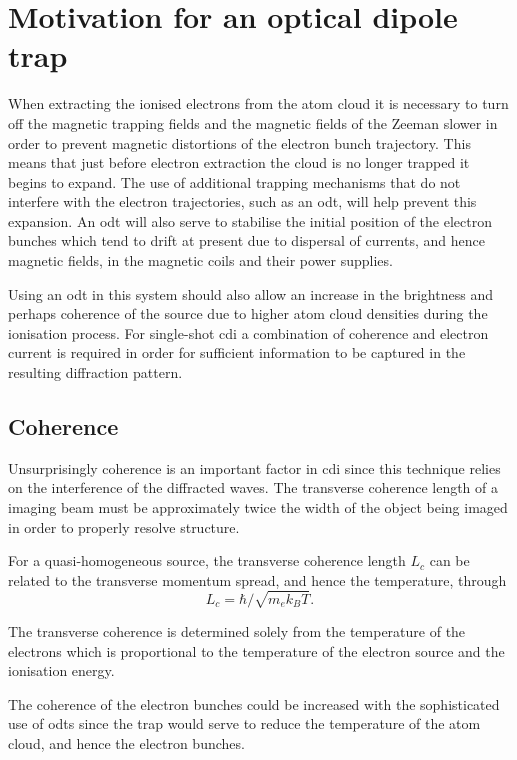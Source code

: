 \section{Motivation for an optical dipole trap}

When extracting the ionised electrons from the atom cloud it is necessary to turn off the magnetic trapping fields and the magnetic fields of the Zeeman slower in order to prevent magnetic distortions of the electron bunch trajectory. This means that just before electron extraction the cloud is no longer trapped it begins to expand. The use of additional trapping mechanisms that do not interfere with the electron trajectories, such as an \gls{odt}, will help prevent this expansion. An \gls{odt} will also serve to stabilise the initial position of the electron bunches which tend to drift at present due to dispersal of currents, and hence magnetic fields, in the magnetic coils and their power supplies.

Using an \gls{odt} in this system should also allow an increase in the brightness and perhaps coherence of the source due to higher atom cloud densities during the ionisation process. For single-shot \gls{cdi} a combination of coherence and electron current is required in order for sufficient information to be captured in the resulting diffraction pattern.

\subsection{Coherence}
Unsurprisingly coherence is an important factor in \gls{cdi} since this technique relies on the interference of the diffracted waves. The transverse coherence length of a imaging beam must be approximately twice the width of the object being imaged\cite{spence_coherence_2004} in order to properly resolve structure.

For a quasi-homogeneous source\cite{nugent_coherent_2009}, the transverse coherence length $L_c$ can be related to the transverse momentum spread, and hence the temperature, through\cite{van_oudheusden_electron_2007}
\begin{equation}
L_c = \hbar/\sqrt{m_e k_B T}.
\end{equation}

The transverse coherence is determined solely from the temperature of the electrons which is proportional to the temperature of the electron source and the ionisation energy.

The coherence of the electron bunches could be increased with the sophisticated use of \glspl{odt} since the trap would serve to reduce the temperature of the atom cloud, and hence the electron bunches.


